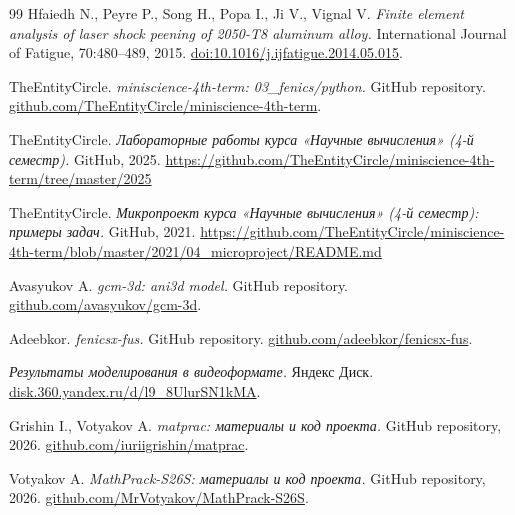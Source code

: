 \begin{thebibliography}{99}
  Hfaiedh N., Peyre P., Song H., Popa I., Ji V., Vignal V.
  \textit{Finite element analysis of laser shock peening of 2050-T8 aluminum alloy.}
  International Journal of Fatigue, 70:480--489, 2015.
  \href{https://doi.org/10.1016/j.ijfatigue.2014.05.015}{doi:10.1016/j.ijfatigue.2014.05.015}.

  TheEntityCircle.
  \textit{miniscience-4th-term: 03\_fenics/python.}
  GitHub repository.
  \href{https://github.com/TheEntityCircle/miniscience-4th-term/tree/master/2025/03_fenics/python}{github.com/TheEntityCircle/miniscience-4th-term}.

  TheEntityCircle.
  \textit{Лабораторные работы курса «Научные вычисления» (4-й семестр).}
  GitHub, 2025.
  \url{https://github.com/TheEntityCircle/miniscience-4th-term/tree/master/2025}

  TheEntityCircle.
  \textit{Микропроект курса «Научные вычисления» (4-й семестр): примеры задач.}
  GitHub, 2021.
  \url{https://github.com/TheEntityCircle/miniscience-4th-term/blob/master/2021/04_microproject/README.md}

  Avasyukov A.
  \textit{gcm-3d: ani3d model.}
  GitHub repository.
  \href{https://github.com/avasyukov/gcm-3d/tree/markered-corpse/models/ani3d}{github.com/avasyukov/gcm-3d}.

  Adeebkor.
  \textit{fenicsx-fus.}
  GitHub repository.
  \href{https://github.com/adeebkor/fenicsx-fus}{github.com/adeebkor/fenicsx-fus}.

  \textit{Результаты моделирования в видеоформате.}
  Яндекс Диск.
  \href{https://disk.360.yandex.ru/d/l9_8UlurSN1kMA}{disk.360.yandex.ru/d/l9\_8UlurSN1kMA}.

  Grishin I., Votyakov A.
  \textit{matprac: материалы и код проекта.}
  GitHub repository, 2026.
  \href{https://github.com/iuriigrishin/matprac}{github.com/iuriigrishin/matprac}.

  Votyakov A.
  \textit{MathPrack-S26S: материалы и код проекта.}
  GitHub repository, 2026.
  \href{https://github.com/MrVotyakov/MathPrack-S26S/}{github.com/MrVotyakov/MathPrack-S26S}.

\end{thebibliography}
